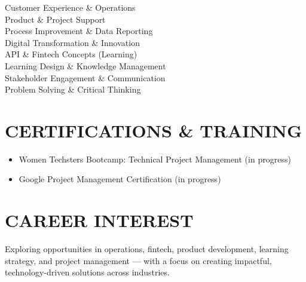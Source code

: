 \documentclass[a4paper,12pt]{article}
\begin{document}
Customer Experience \& Operations \\
Product \& Project Support \\
Process Improvement \& Data Reporting \\
Digital Transformation \& Innovation \\
API \& Fintech Concepts (Learning) \\
Learning Design \& Knowledge Management \\
Stakeholder Engagement \& Communication \\
Problem Solving \& Critical Thinking


\section{CERTIFICATIONS \& TRAINING}

\begin{itemize}[leftmargin=1em,itemsep=3pt,label=--]
    \item Women Techsters Bootcamp: Technical Project Management (in progress)
    \item Google Project Management Certification (in progress)
\end{itemize}


\section{CAREER INTEREST}

Exploring opportunities in operations, fintech, product development, learning strategy, and project management — with a focus on creating impactful, technology-driven solutions across industries.

\vfill
{}
\end{document}
